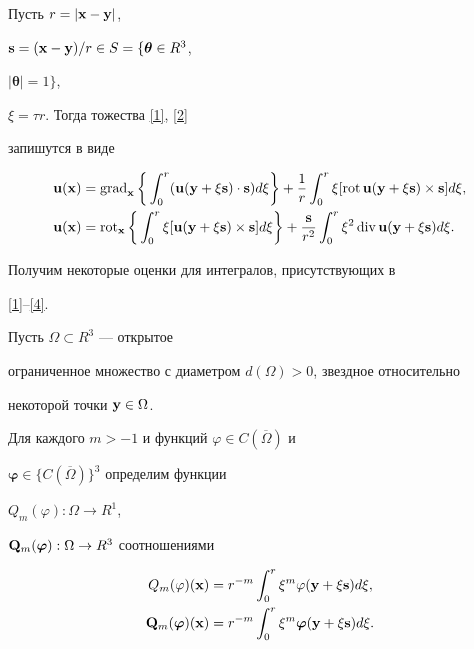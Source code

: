 Пусть $r=|\bold{x}-\bold{y}|$,


$\bold{s}=(\bold{x}-\bold{y})/r\in S=\{\boldsymbol{\theta}\in R^3$,


$|\boldsymbol{\theta}|=1\}$,


$\xi=\tau r$. Тогда тожества \eqref{1}, \eqref{2}


запишутся в виде


\begin{align}


\label{3}


\bold{u}(\bold{x})&=\Grad_{\bold{x}}\bigg\{\int_0^r(\bold{u}(


\bold{y}+\xi\bold{s})\cdot \bold{s})d\xi\bigg\}+\frac{1}{r}\int_0^r\xi


[\Rot\bold{u}(\bold{y}+\xi\bold{s})\times \bold{s}]d\xi, \\


%


\label{4}


\bold{u}(\bold{x})&=\Rot_{\bold{x}}\bigg\{\int_0^r\xi[\bold{u}(


\bold{y}+\xi\bold{s})\times


\bold{s}]d\xi\bigg\}+\frac{\bold{s}}{r^2}\int_0^r\xi^2


\Div\bold{u}(\bold{y}+\xi\bold{s})d\xi.


\end{align}





Получим некоторые оценки для интегралов, присутствующих в


\eqref{1}--\eqref{4}.





Пусть $\Omega \subset R^3 $ --- открытое


ограниченное множество с диаметром ${d(\Omega)>0}$, звездное относительно


некоторой точки $\bold{y}\in\Omega$. 


Для каждого $m>-1$ и функций $\varphi\in C(\overline{\Omega})$ и


$\boldsymbol{\varphi}\in \{C(\overline{\Omega})\}^3$ определим функции


$Q_m(\varphi):\Omega\rightarrow R^1$,


$\bold{Q}_m(\boldsymbol{\varphi}):\Omega\rightarrow R^3$ соотношениями


\begin{align}


Q_m(\varphi)(\bold{x})&=r^{-m}\int_0^r\xi^m\varphi(\bold{y}+


\xi\bold{s})d\xi,\label{5.1}\\


\bold{Q}_m(\boldsymbol{\varphi})(\bold{x})&=r^{-m}\int_0^r\xi^m\boldsymbol{\varphi}


(\bold{y}+\xi\bold{s})d\xi.


\label{5}


\end{align}





